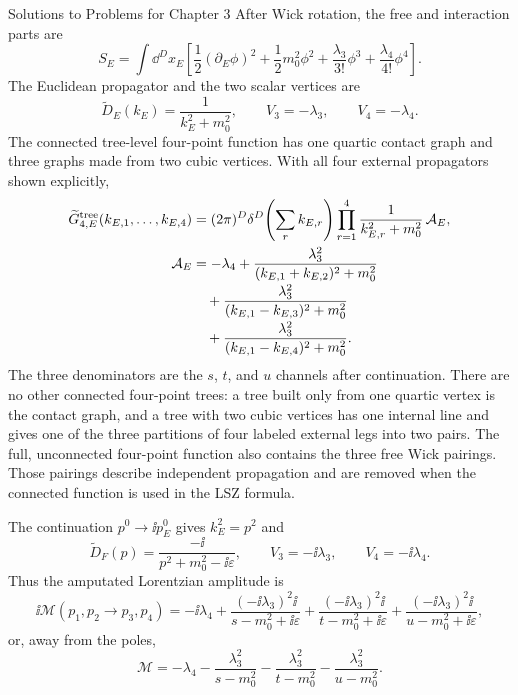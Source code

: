 \begin{bankssolutions}{Solutions to Problems for Chapter 3}
After Wick rotation, the free and interaction parts are
\begin{equation*}
 S_E=\int\dd^D x_E\left[\frac12(\partial_E\phi)^2
 +\frac12m_0^2\phi^2+\frac{\lambda_3}{3!}\phi^3
 +\frac{\lambda_4}{4!}\phi^4\right].
\end{equation*}
The Euclidean propagator and the two scalar vertices are
\begin{equation*}
 \widetilde D_E(k_E)=\frac{1}{k_E^2+m_0^2},
 \qquad V_3=-\lambda_3,
 \qquad V_4=-\lambda_4.
\end{equation*}
The connected tree-level four-point function has one quartic contact graph and
three graphs made from two cubic vertices.  With all four external propagators
shown explicitly,
\begin{align*}
 \widetilde G_{4,E}^{\rm tree}(k_{E,1},\ldots,k_{E,4})
 &=(2\pi)^D\delta^D\!\left(\sum_r k_{E,r}\right)
 \prod_{r=1}^4\frac{1}{k_{E,r}^2+m_0^2}\,\mathcal A_E,\\
 \mathcal A_E
 &=-\lambda_4+\frac{\lambda_3^2}{(k_{E,1}+k_{E,2})^2+m_0^2}\\[-2pt]
 &\quad+\frac{\lambda_3^2}{(k_{E,1}-k_{E,3})^2+m_0^2}\\[-2pt]
 &\quad+\frac{\lambda_3^2}{(k_{E,1}-k_{E,4})^2+m_0^2}.
\end{align*}
The three denominators are the $s$, $t$, and $u$ channels after continuation.
There are no other connected four-point trees: a tree built only from one
quartic vertex is the contact graph, and a tree with two cubic vertices has one
internal line and gives one of the three partitions of four labeled external
legs into two pairs.
The full, unconnected four-point function also contains the three free Wick
pairings.  Those pairings describe independent propagation and are removed
when the connected function is used in the LSZ formula.

The continuation $p^0\to\ii p_E^0$ gives $k_E^2=p^2$ and
\begin{equation*}
 \widetilde D_F(p)=\frac{-\ii}{p^2+m_0^2-\ii\varepsilon},
 \qquad V_3=-\ii\lambda_3,
 \qquad V_4=-\ii\lambda_4.
\end{equation*}
Thus the amputated Lorentzian amplitude is
\begin{equation*}
 \ii\mathcal M(p_1,p_2\to p_3,p_4)
 =-\ii\lambda_4
 +\frac{(-\ii\lambda_3)^2\ii}{s-m_0^2+\ii\varepsilon}
 +\frac{(-\ii\lambda_3)^2\ii}{t-m_0^2+\ii\varepsilon}
 +\frac{(-\ii\lambda_3)^2\ii}{u-m_0^2+\ii\varepsilon},
\end{equation*}
or, away from the poles,
\begin{equation*}
 \mathcal M=-\lambda_4-\frac{\lambda_3^2}{s-m_0^2}
 -\frac{\lambda_3^2}{t-m_0^2}-\frac{\lambda_3^2}{u-m_0^2}.
\end{equation*}


\end{bankssolutions}
